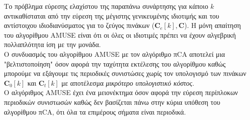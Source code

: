 Το πρόβλημα εύρεσης ελαχίστου της παραπάνω συνάρτησης για κάποιο $k$ αντικαθίσταται από την εύρεση της μέγιστης γενικευμένης ιδιοτιμής και του αντίστοιχου ιδιοδιανύσματος για το ζεύγος πινάκων ($\mathbf{C}_e[k],\mathbf{C}$). Η μόνη απαίτηση του αλγορίθμου AMUSE είναι ότι οι όλες οι ιδιοτιμές πρέπει να έχουν αλγεβρική πολλαπλότητα ίση με την μονάδα.
\\[0.5 \baselineskip]
Ο συνδυασμός του αλγορίθμου AMUSE με τον αλγόριθμο πCA αποτελεί μια "βελτιστοποίηση" όσον αφορά την ταχύτητα εκτέλεσης του αλγορίθμου καθώς μπορούμε να εξάγουμε τις περιοδικές συνιστώσες χωρίς τον υπολογισμό των πινάκων $\mathbf{C}_0[k]$ και $\mathbf{C}_t[k]$ με αποτέλεσμα \emph{μικρότερο υπολογιστικό κόστος}.
\\[0.5 \baselineskip]
Ο αλγόριθμος AMUSE  έχει ένα μειονέκτημα όσον αφορά την εύρεση περίπλοκων περιοδικών συνιστωσών καθώς δεν βασίζεται πάνω στην κύρια υπόθεση του αλγορίθμου πCA, ότι όλα τα επιμέρους σήματα είναι περιοδικά.
